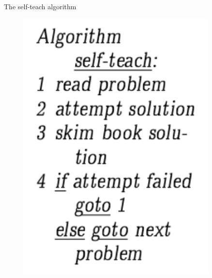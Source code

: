 \documentclass[handout]{beamer}
\begin{document}
\begin{frame}{The self-teach algorithm}
    \begin{figure}[htbp]
        \centering
        \begin{minipage}{0.3\textwidth}
            \centering
            \includegraphics[width=0.9\textwidth]{img/self-teach.png}
        \end{minipage}
        \begin{minipage}{0.3\textwidth}
            \centering

\end{minipage}
\end{figure}
\end{frame}
\end{document}
